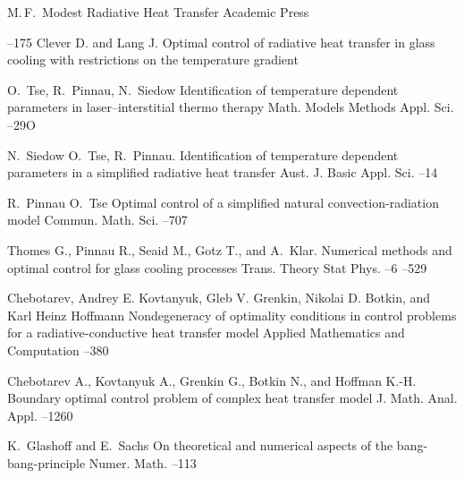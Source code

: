 \begin{thebibliography}{10}

    \by M.\,F.~Modest
    \book Radiative Heat Transfer
    \publ Academic Press

    --175
    \by Clever D. and Lang J.
    \paper Optimal control of radiative heat transfer in glass cooling with restrictions on the temperature gradient

    \by O.~Tse, R.~Pinnau, N.~Siedow
    \paper Identification of temperature dependent parameters in laser--interstitial thermo therapy
    \jour Math. Models Methods Appl. Sci.
    --29O

    \by N.~Siedow O.~Tse, R.~Pinnau.
    \paper Identification of temperature dependent parameters in a simplified radiative heat transfer
    \jour Aust. J. Basic Appl. Sci.
    --14

    \by R.~Pinnau O.~Tse
    \paper Optimal control of a simplified natural convection-radiation model
    \jour Commun. Math. Sci.
    --707

    \by Thomes G., Pinnau R., Seaid M., Gotz T., and A.~Klar.
    \pages Numerical methods and optimal control for glass cooling processes
    \jour Trans. Theory Stat Phys.
    --6
    –529


     Chebotarev, {Andrey E.} Kovtanyuk, {Gleb V.} Grenkin, {Nikolai D.} Botkin, and {Karl Heinz} Hoffmann
    \paper Nondegeneracy of optimality conditions in control problems for a radiative-conductive heat transfer model
    \jour Applied Mathematics and Computation
    --380

    Chebotarev A., Kovtanyuk A., Grenkin G., Botkin N., and Hoffman K.-H.
    \paper Boundary optimal control problem of complex heat transfer model
    \jour J. Math. Anal. Appl.
    –1260

    \by K.~Glashoff and E.~Sachs
    \paper On theoretical and numerical aspects of the bang-bang-principle
    \jour Numer. Math.
    –113


\end{thebibliography}
